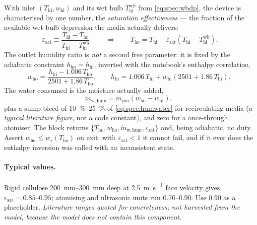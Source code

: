 \documentclass[11pt]{article}
\newcommand{\md}{\ensuremath{\dot m}}
\newcommand{\mdp}{\ensuremath{\dot m_{\mathrm{pro}}}}
\begin{document}
With inlet $(T_{\mathrm{hi}}, w_{\mathrm{hi}})$ and its wet bulb $T_{\mathrm{hi}}^{\mathrm{wb}}$ from
\eqref{eq:spec:wbdp}, the device is characterised by one number, the \emph{saturation
effectiveness} --- the fraction of the available wet-bulb depression the media actually delivers:
\begin{equation}
\boxed{\;
\varepsilon_{\mathrm{sat}} \equiv
\frac{T_{\mathrm{hi}} - T_{\mathrm{ho}}}{T_{\mathrm{hi}} - T_{\mathrm{hi}}^{\mathrm{wb}}}
\;}
\qquad\Longrightarrow\qquad
T_{\mathrm{ho}} = T_{\mathrm{hi}} - \varepsilon_{\mathrm{sat}}
 \left(T_{\mathrm{hi}} - T_{\mathrm{hi}}^{\mathrm{wb}}\right) .
\label{eq:spec:epssat}
\end{equation}
The outlet humidity ratio is \emph{not} a second free parameter: it is fixed by the adiabatic
constraint $h_{\mathrm{ho}} = h_{\mathrm{hi}}$, inverted with the notebook's enthalpy correlation,
\begin{equation}
w_{\mathrm{ho}} = \frac{h_{\mathrm{hi}} - 1.006\,T_{\mathrm{ho}}}{2501 + 1.86\,T_{\mathrm{ho}}} ,
\qquad
h_{\mathrm{hi}} = 1.006\,T_{\mathrm{hi}} + w_{\mathrm{hi}}(2501 + 1.86\,T_{\mathrm{hi}}) .
\label{eq:spec:humw}
\end{equation}
The water consumed is the moisture actually added,
\begin{equation}
\md_{\mathrm{w,hum}} = \mdp\left(w_{\mathrm{ho}} - w_{\mathrm{hi}}\right) ,
\label{eq:spec:humwater}
\end{equation}
plus a sump bleed of \SIrange{10}{25}{\percent} of \eqref{eq:spec:humwater} for recirculating media
(a \emph{typical literature figure}, not a code constant), and zero for a once-through atomiser. The
block returns $\{T_{\mathrm{ho}}, w_{\mathrm{ho}}, \md_{\mathrm{w,hum}},
\varepsilon_{\mathrm{sat}}\}$ and, being adiabatic, no duty. Assert
$w_{\mathrm{ho}} \le w_{s}(T_{\mathrm{ho}})$ on exit: with $\varepsilon_{\mathrm{sat}}<1$ it cannot
fail, and if it ever does the enthalpy inversion was called with an inconsistent state.

\paragraph{Typical values.} Rigid cellulose \SIrange{200}{300}{\milli\metre} deep at
\SI{2.5}{\metre\per\second} face velocity gives $\varepsilon_{\mathrm{sat}} = \numrange{0.85}{0.95}$;
atomising and ultrasonic units run \numrange{0.70}{0.90}. Use $0.90$ as a placeholder.
\emph{Literature ranges quoted for concreteness; not harvested from the model, because the model does
not contain this component.}
\end{document}
